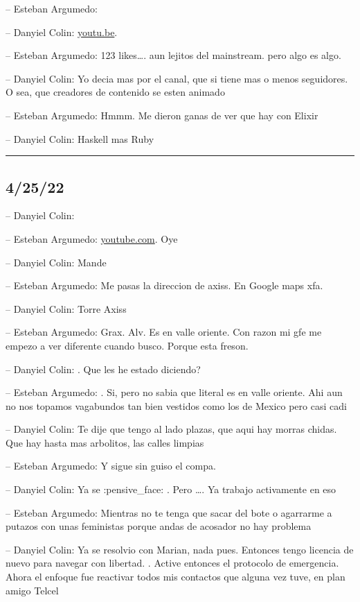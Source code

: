 -- Esteban Argumedo:

-- Danyiel Colin: \href{https://youtu.be/o-RE0qBGRRA}{youtu.be}.

-- Esteban Argumedo: 123 likes\ldots. aun lejitos del mainstream. pero
algo es algo.

-- Danyiel Colin: Yo decia mas por el canal, que si tiene mas o menos
seguidores. O sea, que creadores de contenido se esten animado

-- Esteban Argumedo: Hmmm. Me dieron ganas de ver que hay con Elixir

-- Danyiel Colin: Haskell mas Ruby

\begin{center}\rule{0.5\linewidth}{0.5pt}\end{center}

\hypertarget{section-62}{%
\subsection{4/25/22}\label{section-62}}

-- Danyiel Colin:

-- Esteban Argumedo:
\href{https://youtube.com/shorts/dWe652wJrbU?feature=share}{youtube.com}.
Oye

-- Danyiel Colin: Mande

-- Esteban Argumedo: Me pasas la direccion de axiss. En Google maps xfa.

-- Danyiel Colin: Torre Axiss

-- Esteban Argumedo: Grax. Alv. Es en valle oriente. Con razon mi gfe me
empezo a ver diferente cuando busco. Porque esta freson.

-- Danyiel Colin: . Que les he estado diciendo?

-- Esteban Argumedo: . Si, pero no sabia que literal es en valle
oriente. Ahi aun no nos topamos vagabundos tan bien vestidos como los de
Mexico pero casi cadi

-- Danyiel Colin: Te dije que tengo al lado plazas, que aqui hay morras
chidas. Que hay hasta mas arbolitos, las calles limpias

-- Esteban Argumedo: Y sigue sin guiso el compa.

-- Danyiel Colin: Ya se :pensive\_face: . Pero \ldots. Ya trabajo
activamente en eso

-- Esteban Argumedo: Mientras no te tenga que sacar del bote o agarrarme
a putazos con unas feministas porque andas de acosador no hay problema

-- Danyiel Colin: Ya se resolvio con Marian, nada pues. Entonces tengo
licencia de nuevo para navegar con libertad. . Active entonces el
protocolo de emergencia. Ahora el enfoque fue reactivar todos mis
contactos que alguna vez tuve, en plan amigo Telcel

